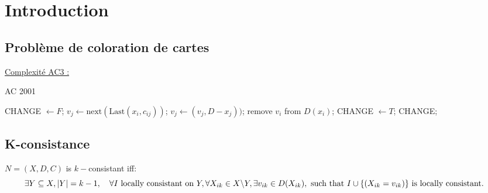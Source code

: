 





\section{Introduction}

\subsection{Problème de coloration de cartes}

\underline{Complexité AC3 :}


\begin{algorithm}[t]
    \caption{AC 2001}
    \label{algo_ac2001}
    \begin{algorithmic}[1]
            \State CHANGE $\gets F$;
                \State $v_j \gets \mbox{next}(\mbox{Last}(x_i, c_{ij}))$;
                    \State $v_j \gets (v_j, D-x_j))$;
                \EndWhile
                    \State remove $v_i$ from $D(x_i)$;
                    \State CHANGE $\gets T$;
                \EndIf
            \EndFor
            \State \Return CHANGE;
        \EndFunction
    \end{algorithmic}
\end{algorithm}

\subsection{K-consistance}

$N = (X, D, C)$ is $k-$consistant iff: \begin{displaymath}
\exists Y \subseteq X, | Y | = k -1, \quad \forall I \mbox{ locally consistant on } Y, \forall
X_{ik} \in X \backslash Y, \exists v_{ik} \in D(X_{ik}),\newline \mbox{ such that } I \cup \{(X_{ik} =
v_{ik})\} \mbox{ is locally consistant. }
\end{displaymath}

